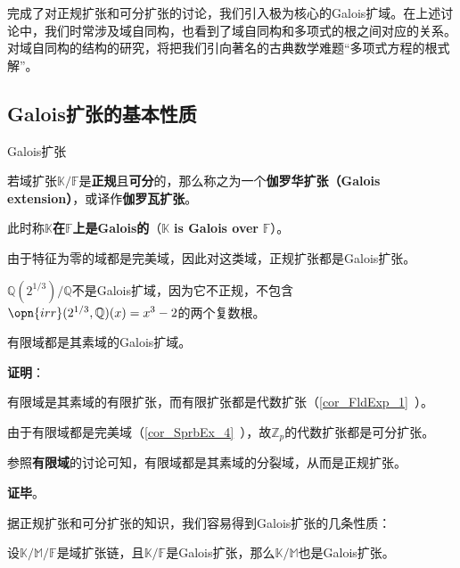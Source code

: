 


完成了对正规扩张和可分扩张的讨论，我们引入极为核心的Galois扩域。在上述讨论中，我们时常涉及域自同构，也看到了域自同构和多项式的根之间对应的关系。对域自同构的结构的研究，将把我们引向著名的古典数学难题“多项式方程的根式解”。



\subsection{Galois扩张的基本性质}

\begin{definition}{Galois扩张}

若域扩张$\mathbb{K}/\mathbb{F}$是\textbf{正规}且\textbf{可分}的，那么称之为一个\textbf{伽罗华扩张（Galois extension）}，或译作\textbf{伽罗瓦扩张}。

此时称$\mathbb{K}$\textbf{在}$\mathbb{F}$\textbf{上是Galois的}（$\mathbb{K}$ \textbf{is Galois over} $\mathbb{F}$）。

\end{definition}

由于特征为零的域都是完美域，因此对这类域，正规扩张都是Galois扩张。

\begin{example}{}
$\mathbb{Q}(2^{1/3})/\mathbb{Q}$不是Galois扩域，因为它不正规，不包含$\opn{irr}(2^{1/3}, \mathbb{Q})(x)=x^3-2$的两个复数根。
\end{example}

\begin{theorem}{}
有限域都是其素域的Galois扩域。
\end{theorem}

\textbf{证明}：

有限域是其素域的有限扩张，而有限扩张都是代数扩张（\autoref{cor_FldExp_1}~）。

由于有限域都是完美域（\autoref{cor_SprbEx_4}~），故$\mathbb{Z}_p$的代数扩张都是可分扩张。

参照\textbf{有限域}的讨论可知，有限域都是其素域的分裂域，从而是正规扩张。

\textbf{证毕}。


据正规扩张和可分扩张的知识，我们容易得到Galois扩张的几条性质：


\begin{theorem}{}\label{the_GExt_6}
设$\mathbb{K}/\mathbb{M}/\mathbb{F}$是域扩张链，且$\mathbb{K}/\mathbb{F}$是Galois扩张，那么$\mathbb{K}/\mathbb{M}$也是Galois扩张。
\end{theorem}

